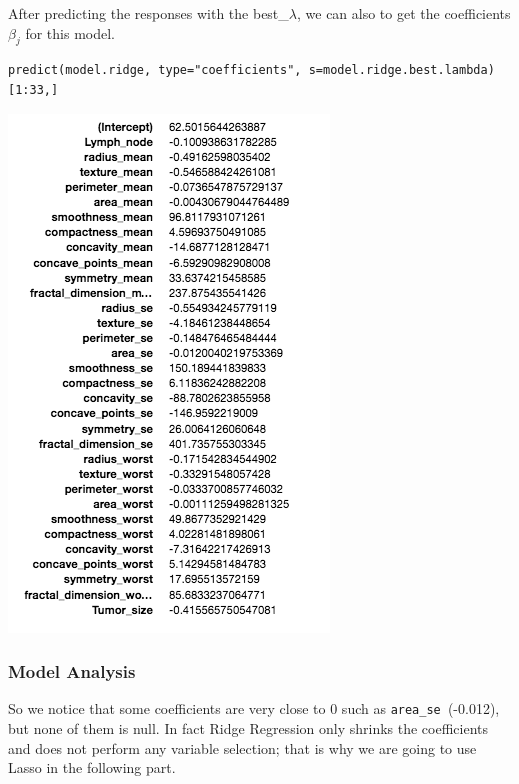 \documentclass[]{report}
\begin{document}
After predicting the responses with the best\_$\lambda$,  we can also to get the coefficients $\beta_{j}$ for this model.

\begin{lstlisting}
predict(model.ridge, type="coefficients", s=model.ridge.best.lambda)[1:33,]
\end{lstlisting}

\begin{center}
	\includegraphics[width=0.8\linewidth]{Figures/ridge_coeff}
\end{center}

\subsubsection{Model Analysis} \label{Ridge Model Analysis}
So we notice that some coefficients are very close to 0 such as \texttt{area\_se }(-0.012), but none of them is null. In fact Ridge Regression only shrinks the coefficients and does not perform any variable selection;  that is why we are going to use Lasso in the following part.
\end{document}
